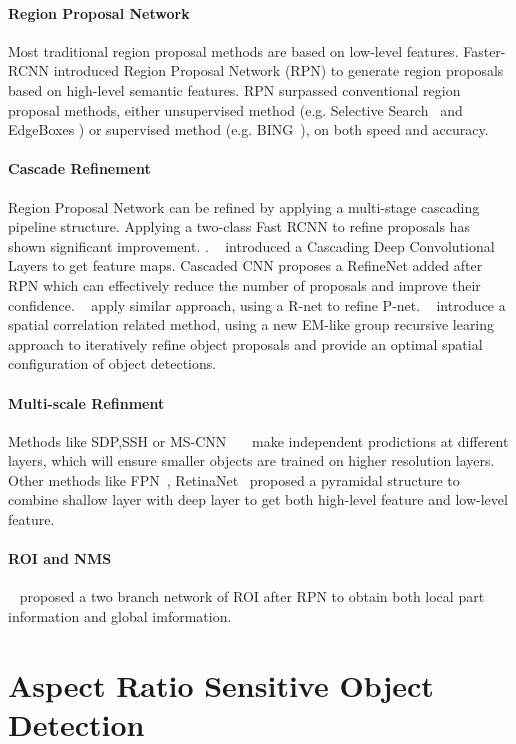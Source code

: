 \documentclass[10pt,twocolumn,letterpaper]{article}
\begin{document}
\paragraph{Region Proposal Network}
Most traditional region proposal methods are based on low-level features. Faster-RCNN introduced Region Proposal Network (RPN) to generate region proposals based on high-level semantic features. RPN surpassed conventional region proposal methods, either unsupervised method (e.g. Selective Search~\cite{SelectiveSearch} and EdgeBoxes \cite{EdgeBoxes}) or supervised method (e.g. BING~\cite{BING}), on both speed and accuracy.
\paragraph{Cascade Refinement}
Region Proposal Network can be refined by applying a multi-stage cascading pipeline structure. Applying a two-class Fast RCNN to refine proposals has shown significant improvement. \cite{CRAFT} \cite{CraftingGBD} \cite{DeepBox}.  ~\citet{DeepProposal} introduced a Cascading Deep Convolutional Layers to get feature maps. Cascaded CNN \cite{Cascadedcnn} proposes a RefineNet added after RPN which can effectively reduce the number of proposals and improve their confidence. ~\citet{MTCNN} apply similar approach, using a R-net to refine P-net. ~\citet{GroupRecursive} introduce a spatial correlation related method, using a new EM-like group recursive learing approach to iteratively refine object proposals and provide an optimal spatial configuration of object detections.
\paragraph{Multi-scale Refinment}
Methods like SDP,SSH or MS-CNN ~\cite{SDP}~\cite{SSH}~\cite{MSCNN}make independent prodictions at different layers, which will ensure smaller objects are trained on higher resolution layers. Other methods like FPN~\cite{FPN}, RetinaNet~\cite{RetinaNet} proposed a pyramidal structure to combine shallow layer with deep layer to get both high-level feature and low-level feature.
\paragraph{ROI and NMS}
~\citet{CoupleNet} proposed a two branch network of ROI after RPN to obtain both local part information and global imformation.

\section{Aspect Ratio Sensitive Object Detection}
\end{document}
